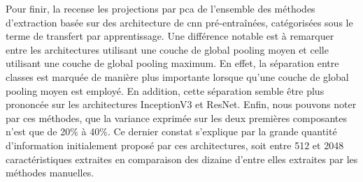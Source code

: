 Pour finir, la  recense les projections par \gls{pca} de l'ensemble des méthodes d'extraction basée sur des architecture de \gls{cnn} pré-entraînées, catégorisées sous le terme de transfert par apprentissage. Une différence notable est à remarquer entre les architectures utilisant une couche de global pooling moyen et celle utilisant une couche de global pooling maximum. En effet, la séparation entre classes est marquée de manière plus importante lorsque qu'une couche de global pooling moyen est employé. En addition, cette séparation semble être plus prononcée sur les architectures InceptionV3 et ResNet. Enfin, nous pouvons noter par ces méthodes, que la variance exprimée sur les deux premières composantes n'est que de 20\% à 40\%. Ce dernier constat s'explique par la grande quantité d'information initialement proposé par ces architectures, soit entre 512 et 2048 caractéristiques extraites en comparaison des dizaine d'entre elles extraites par les méthodes manuelles.\par

